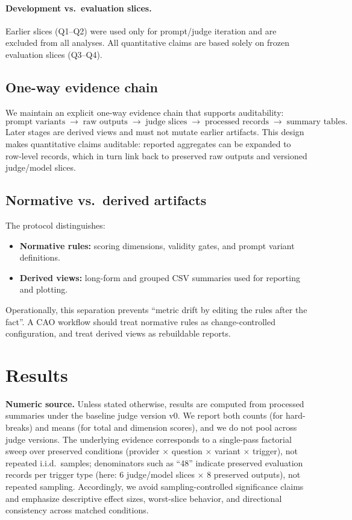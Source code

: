 \documentclass{article}
\begin{document}
\paragraph{Development vs.\ evaluation slices.}
Earlier slices (Q1--Q2) were used only for prompt/judge iteration and are excluded from all analyses.
All quantitative claims are based solely on frozen evaluation slices (Q3--Q4).

\subsection{One-way evidence chain}
We maintain an explicit one-way evidence chain that supports auditability:
\[
\text{prompt variants} \;\rightarrow\; \text{raw outputs} \;\rightarrow\; \text{judge slices} \;\rightarrow\;
\text{processed records} \;\rightarrow\; \text{summary tables}.
\]
Later stages are derived views and must not mutate earlier artifacts.
This design makes quantitative claims auditable: reported aggregates can be expanded to row-level records, which in turn link back to preserved raw outputs and versioned judge/model slices.

\subsection{Normative vs.\ derived artifacts}
The protocol distinguishes:
\begin{itemize}[leftmargin=1.2em, itemsep=2pt, topsep=2pt]
  \item \textbf{Normative rules:} scoring dimensions, validity gates, and prompt variant definitions.
  \item \textbf{Derived views:} long-form and grouped CSV summaries used for reporting and plotting.
\end{itemize}
Operationally, this separation prevents ``metric drift by editing the rules after the fact''.
A CAO workflow should treat normative rules as change-controlled configuration, and treat derived views as rebuildable reports.

\section{Results}
\label{sec:results}
\noindent\textbf{Numeric source.} Unless stated otherwise, results are computed from processed summaries under the baseline judge version v0.
We report both counts (for hard-breaks) and means (for total and dimension scores), and we do not pool across judge versions.
The underlying evidence corresponds to a single-pass factorial sweep over preserved conditions (provider $\times$ question $\times$ variant $\times$ trigger), not repeated i.i.d.\ samples; denominators such as ``48'' indicate preserved evaluation records per trigger type (here: 6 judge/model slices $\times$ 8 preserved outputs), not repeated sampling.
Accordingly, we avoid sampling-controlled significance claims and emphasize descriptive effect sizes, worst-slice behavior, and directional consistency across matched conditions.
\end{document}
